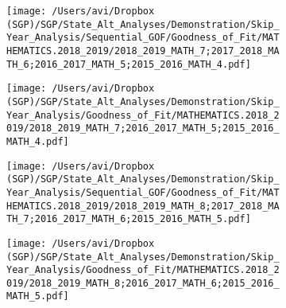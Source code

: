 \documentclass[12pt]{article}
\begin{document}
\begin{figure}[H]
\caption*{{{\bf{Figure A3:}} } Sequential (left) and skip-year (right) fit plots for Math (grades 7 - 8)}
  \begin{subfigure}[b]{0.5\textwidth}
    \texttt{[image: /Users/avi/Dropbox (SGP)/SGP/State\_Alt\_Analyses/Demonstration/Skip\_Year\_Analysis/Sequential\_GOF/Goodness\_of\_Fit/MATHEMATICS.2018\_2019/2018\_2019\_MATH\_7;2017\_2018\_MATH\_6;2016\_2017\_MATH\_5;2015\_2016\_MATH\_4.pdf]}
  \end{subfigure}
  \begin{subfigure}[b]{0.5\textwidth}
    \texttt{[image: /Users/avi/Dropbox (SGP)/SGP/State\_Alt\_Analyses/Demonstration/Skip\_Year\_Analysis/Goodness\_of\_Fit/MATHEMATICS.2018\_2019/2018\_2019\_MATH\_7;2016\_2017\_MATH\_5;2015\_2016\_MATH\_4.pdf]}
  \end{subfigure}
  \begin{subfigure}[b]{0.5\textwidth}
    \texttt{[image: /Users/avi/Dropbox (SGP)/SGP/State\_Alt\_Analyses/Demonstration/Skip\_Year\_Analysis/Sequential\_GOF/Goodness\_of\_Fit/MATHEMATICS.2018\_2019/2018\_2019\_MATH\_8;2017\_2018\_MATH\_7;2016\_2017\_MATH\_6;2015\_2016\_MATH\_5.pdf]}
  \end{subfigure}
  \begin{subfigure}[b]{0.5\textwidth}
    \texttt{[image: /Users/avi/Dropbox (SGP)/SGP/State\_Alt\_Analyses/Demonstration/Skip\_Year\_Analysis/Goodness\_of\_Fit/MATHEMATICS.2018\_2019/2018\_2019\_MATH\_8;2016\_2017\_MATH\_6;2015\_2016\_MATH\_5.pdf]}
  \end{subfigure}
\end{figure}
\end{document}
